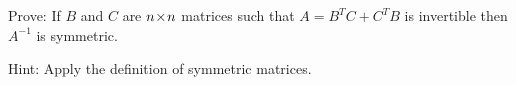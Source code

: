 
\begin{Exercise}[
name={},
title={}, 
difficulty=0,
origin={\cite{YL}}]
Prove: If $B$ and $C$ are $n \! \times \! n$ matrices such that $A=B^TC+C^TB$ is invertible then $A^{-1}$ is symmetric.
\end{Exercise}

\begin{Answer}
Hint: Apply the definition of symmetric matrices.
\end{Answer}
